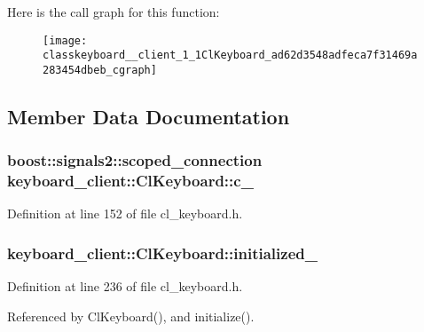 Here is the call graph for this function\+:
\nopagebreak
\begin{figure}[H]
\begin{center}
\leavevmode
\texttt{[image: classkeyboard\_\_client\_1\_1ClKeyboard\_ad62d3548adfeca7f31469a283454dbeb\_cgraph]}
\end{center}
\end{figure}




\subsection{Member Data Documentation}
\subsubsection[{\texorpdfstring{c\+\_\+}{c_}}]{\setlength{\rightskip}{0pt plus 5cm}boost\+::signals2\+::scoped\+\_\+connection keyboard\+\_\+client\+::\+Cl\+Keyboard\+::c\+\_\+}\hypertarget{classkeyboard__client_1_1ClKeyboard_a32d0c1c037454900708b58b709767e56}{}\label{classkeyboard__client_1_1ClKeyboard_a32d0c1c037454900708b58b709767e56}


Definition at line 152 of file cl\+\_\+keyboard.\+h.

\subsubsection[{\texorpdfstring{initialized\+\_\+}{initialized_}}]{ keyboard\+\_\+client\+::\+Cl\+Keyboard\+::initialized\+\_\+\hspace{0.3cm}{\ttfamily [private]}}\hypertarget{classkeyboard__client_1_1ClKeyboard_aff74d4f212f4846a1f7cc6c0e4d5f728}{}\label{classkeyboard__client_1_1ClKeyboard_aff74d4f212f4846a1f7cc6c0e4d5f728}


Definition at line 236 of file cl\+\_\+keyboard.\+h.



Referenced by Cl\+Keyboard(), and initialize().

